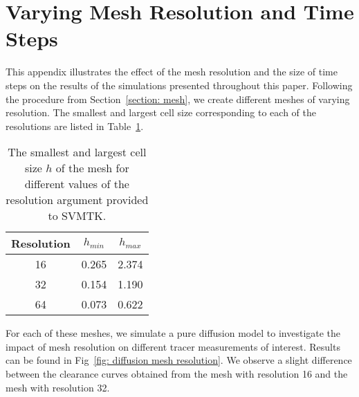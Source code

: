 \documentclass[10pt]{article}
\newcommand{\AP}[1]{\textcolor{blue}{AP: #1}}
\newcommand{\1}{^{(1)}}
\newcommand{\2}{^{(2)}}
\begin{document}
\FloatBarrier
\section{Varying Mesh Resolution and Time Steps}
\label{app:model-num}

This appendix illustrates the effect of the mesh resolution and the size of time steps on the results of the simulations presented throughout this paper.
Following the procedure from Section~\ref{section: mesh}, we create different meshes of varying resolution. The smallest and largest cell size corresponding to each of the resolutions are listed in Table~\ref{tab:mesh-resolution}. 
\begin{table}[h]
    \centering
    \captionsetup{width=0.6\textwidth}
    \begin{tabular}{c|c|c}
        Resolution   & $h_{min}$ & $h_{max}$\\
        \hline
    	16  &  0.265  &  2.374  \\
    	32  &  0.154  &  1.190  \\
    	64  &  0.073  &  0.622  \\
    \end{tabular}
    \caption{The smallest and largest cell size $h$ of the mesh for different values of the resolution argument provided to SVMTK.}
    \label{tab:mesh-resolution}
\end{table}
For each of these meshes, we simulate a pure diffusion model to investigate the impact of mesh resolution on different tracer measurements of interest. Results can be found in Fig~\ref{fig: diffusion mesh resolution}. We observe a slight difference between the clearance curves obtained from the mesh with resolution 16 and the mesh with resolution 32.
\end{document}
